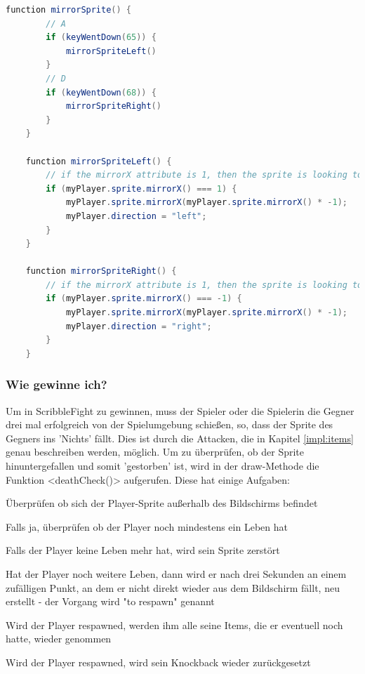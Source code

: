\begin{lstlisting}[caption=Sprite Richtungswechsel,language=Java,label=lst:impl:mirrorSprite]
    function mirrorSprite() {
        // A
        if (keyWentDown(65)) {
            mirrorSpriteLeft()
        }
        // D
        if (keyWentDown(68)) {
            mirrorSpriteRight()
        }
    }
    
    function mirrorSpriteLeft() {
        // if the mirrorX attribute is 1, then the sprite is looking to the right
        if (myPlayer.sprite.mirrorX() === 1) {
            myPlayer.sprite.mirrorX(myPlayer.sprite.mirrorX() * -1);
            myPlayer.direction = "left";
        }
    }
    
    function mirrorSpriteRight() {
        // if the mirrorX attribute is 1, then the sprite is looking to the left
        if (myPlayer.sprite.mirrorX() === -1) {
            myPlayer.sprite.mirrorX(myPlayer.sprite.mirrorX() * -1);
            myPlayer.direction = "right";
        }
    }
\end{lstlisting}

\subsubsection{Wie gewinne ich?} \label{impl:win}
Um in ScribbleFight zu gewinnen, muss der Spieler oder die Spielerin die Gegner drei mal erfolgreich von der Spielumgebung schießen, so, dass der Sprite des Gegners ins 'Nichts' fällt.
Dies ist durch die Attacken, die in Kapitel \ref{impl:items} genau beschreiben werden, möglich.
Um zu überprüfen, ob der Sprite hinuntergefallen und somit 'gestorben' ist, wird in der draw-Methode die Funktion <deathCheck()> aufgerufen.
Diese hat einige Aufgaben:
\begin{compactitem}
    \item Überprüfen ob sich der Player-Sprite außerhalb des Bildschirms befindet
    \item Falls ja, überprüfen ob der Player noch mindestens ein Leben hat
    \item Falls der Player keine Leben mehr hat, wird sein Sprite zerstört
    \item Hat der Player noch weitere Leben, dann wird er nach drei Sekunden an einem zufälligen Punkt, an dem er nicht direkt wieder aus dem Bildschirm fällt, neu erstellt - der Vorgang wird "to respawn" genannt
    \item Wird der Player respawned, werden ihm alle seine Items, die er eventuell noch hatte, wieder genommen
    \item Wird der Player respawned, wird sein Knockback wieder zurückgesetzt
\end{compactitem}


